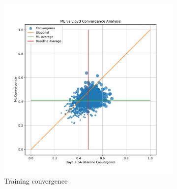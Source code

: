 \documentclass{article}
\begin{document}

\begin{figure}[h]
  \centering
  \begin{subfigure}[t]{0.49\textwidth}
    \centering
    \includegraphics[width=\textwidth]{train_convergence.pdf}
    \caption{Training convergence}
  \end{subfigure}
  \begin{subfigure}[t]{0.49\textwidth}
    \centering

\end{subfigure}
\end{figure}
\end{document}
